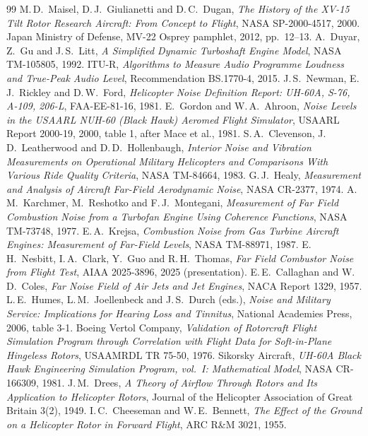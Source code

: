 \documentclass[10pt,a4paper,twocolumn]{article}
\begin{document}
\begin{thebibliography}{99}
 M.\,D.\ Maisel, D.\,J.\ Giulianetti and D.\,C.\ Dugan, \emph{The History of the XV-15 Tilt Rotor Research Aircraft: From Concept to Flight}, NASA SP-2000-4517, 2000.
 Japan Ministry of Defense, MV-22 Osprey pamphlet, 2012, pp.\ 12--13.
 A.\ Duyar, Z.\ Gu and J.\,S.\ Litt, \emph{A Simplified Dynamic Turboshaft Engine Model}, NASA TM-105805, 1992.
 ITU-R, \emph{Algorithms to Measure Audio Programme Loudness and True-Peak Audio Level}, Recommendation BS.1770-4, 2015.
 J.\,S.\ Newman, E.\,J.\ Rickley and D.\,W.\ Ford, \emph{Helicopter Noise Definition Report: UH-60A, S-76, A-109, 206-L}, FAA-EE-81-16, 1981.
 E.\ Gordon and W.\,A.\ Ahroon, \emph{Noise Levels in the USAARL NUH-60 (Black Hawk) Aeromed Flight Simulator}, USAARL Report 2000-19, 2000, table 1, after Mace et al., 1981.
 S.\,A.\ Clevenson, J.\,D.\ Leatherwood and D.\,D.\ Hollenbaugh, \emph{Interior Noise and Vibration Measurements on Operational Military Helicopters and Comparisons With Various Ride Quality Criteria}, NASA TM-84664, 1983.
 G.\,J.\ Healy, \emph{Measurement and Analysis of Aircraft Far-Field Aerodynamic Noise}, NASA CR-2377, 1974.
 A.\,M.\ Karchmer, M.\ Reshotko and F.\,J.\ Montegani, \emph{Measurement of Far Field Combustion Noise from a Turbofan Engine Using Coherence Functions}, NASA TM-73748, 1977.
 E.\,A.\ Krejsa, \emph{Combustion Noise from Gas Turbine Aircraft Engines: Measurement of Far-Field Levels}, NASA TM-88971, 1987.
 E.\,H.\ Nesbitt, I.\,A.\ Clark, Y.\ Guo and R.\,H.\ Thomas, \emph{Far Field Combustor Noise from Flight Test}, AIAA 2025-3896, 2025 (presentation).
 E.\,E.\ Callaghan and W.\,D.\ Coles, \emph{Far Noise Field of Air Jets and Jet Engines}, NACA Report 1329, 1957.
 L.\,E.\ Humes, L.\,M.\ Joellenbeck and J.\,S.\ Durch (eds.), \emph{Noise and Military Service: Implications for Hearing Loss and Tinnitus}, National Academies Press, 2006, table 3-1.
 Boeing Vertol Company, \emph{Validation of Rotorcraft Flight Simulation Program through Correlation with Flight Data for Soft-in-Plane Hingeless Rotors}, USAAMRDL TR 75-50, 1976.
 Sikorsky Aircraft, \emph{UH-60A Black Hawk Engineering Simulation Program, vol.~I: Mathematical Model}, NASA CR-166309, 1981.
 J.\,M.\ Drees, \emph{A Theory of Airflow Through Rotors and Its Application to Helicopter Rotors}, Journal of the Helicopter Association of Great Britain 3(2), 1949.
 I.\,C.\ Cheeseman and W.\,E.\ Bennett, \emph{The Effect of the Ground on a Helicopter Rotor in Forward Flight}, ARC R\&M 3021, 1955.

\end{thebibliography}
\end{document}
